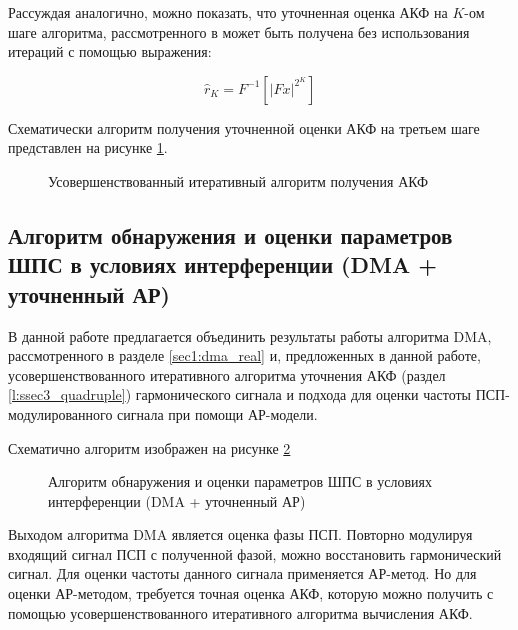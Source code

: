 Рассуждая аналогично, можно показать, что уточненная оценка АКФ на ${K}$-ом шаге алгоритма, рассмотренного в \cite{ostanin_akf}
может быть получена без использования итераций с помощью выражения:

\begin{center}
\begin{equation}
	\label{eq:akf_3}
	\hat{r}_K = F^{-1}\left[ \left| Fx \right| ^{2^K} \right]
\end{equation}
\end{center}

Схематически алгоритм получения уточненной оценки АКФ на третьем шаге представлен на рисунке \ref{pic:akf_pic}.

\begin{figure}[H]
	\center{}
	\caption{Усовершенствованный итеративный алгоритм получения АКФ}
	\label{pic:akf_pic}
\end{figure}

\subsection{Алгоритм обнаружения и оценки параметров ШПС в условиях интерференции (DMA + уточненный АР)}
\label{l:ssec3_dma_lpc_algo}

В данной работе предлагается объединить результаты работы алгоритма DMA, рассмотренного в разделе
\ref{sec1:dma_real} и, предложенных в данной работе, усовершенствованного итеративного 
алгоритма уточнения АКФ (раздел \ref{l:ssec3_quadruple}) гармонического сигнала и 
подхода для оценки частоты ПСП-модулированного сигнала при помощи АР-модели.

Схематично алгоритм изображен на рисунке \ref{pic4:dma_quadruple_lpc}

\begin{figure}[H]
\center{}
	\caption{Алгоритм обнаружения и оценки параметров ШПС в условиях интерференции (DMA + уточненный АР)}
	\label{pic4:dma_quadruple_lpc}
\end{figure}

Выходом алгоритма DMA является оценка фазы ПСП. Повторно модулируя входящий сигнал ПСП с полученной
фазой, можно восстановить гармонический сигнал. Для оценки частоты данного сигнала применяется
АР-метод. Но для оценки АР-методом, требуется точная оценка АКФ, которую можно получить
с помощью усовершенствованного итеративного алгоритма вычисления АКФ.

